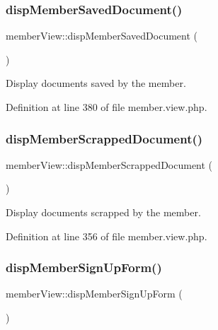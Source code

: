 \subsubsection{\texorpdfstring{disp\+Member\+Saved\+Document()}{dispMemberSavedDocument()}}
{\footnotesize\ttfamily member\+View\+::disp\+Member\+Saved\+Document (\begin{DoxyParamCaption}{ }\end{DoxyParamCaption})}



Display documents saved by the member. 



Definition at line 380 of file member.\+view.\+php.

\hypertarget{classmemberView_a3f2cb0686636f31174aeba8e2e048816}{}\label{classmemberView_a3f2cb0686636f31174aeba8e2e048816} 
\subsubsection{\texorpdfstring{disp\+Member\+Scrapped\+Document()}{dispMemberScrappedDocument()}}
{\footnotesize\ttfamily member\+View\+::disp\+Member\+Scrapped\+Document (\begin{DoxyParamCaption}{ }\end{DoxyParamCaption})}



Display documents scrapped by the member. 



Definition at line 356 of file member.\+view.\+php.

\hypertarget{classmemberView_a1ebd31e392f344898940c0dc739fa6cb}{}\label{classmemberView_a1ebd31e392f344898940c0dc739fa6cb} 
\subsubsection{\texorpdfstring{disp\+Member\+Sign\+Up\+Form()}{dispMemberSignUpForm()}}
{\footnotesize\ttfamily member\+View\+::disp\+Member\+Sign\+Up\+Form (\begin{DoxyParamCaption}{ }\end{DoxyParamCaption})}



